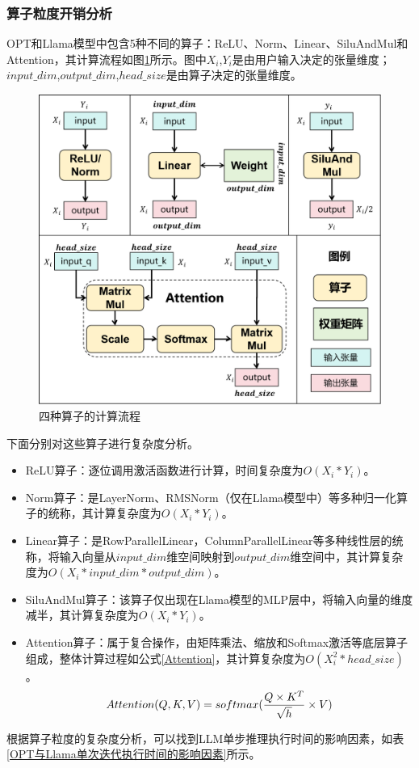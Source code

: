 \documentclass[a4paper, nosysfonts]{hpcchina}
\begin{document}
\subsubsection{算子粒度开销分析}
OPT和Llama模型中包含5种不同的算子：ReLU、Norm、Linear、SiluAndMul和Attention，其计算流程如图\ref{四种算子的计算流程}所示。图中$X_i$,$Y_i$是由用户输入决定的张量维度；$input\_dim$,$output\_dim$,$head\_size$是由算子决定的张量维度。 
\par
\begin{figure}[!htbp]
  \centering
  \includegraphics[width=0.9\linewidth]
  {四种算子的计算流程.png}
  \caption{四种算子的计算流程}
  \label{四种算子的计算流程}
\end{figure}

下面分别对这些算子进行复杂度分析。 \par
\begin{itemize}
  \item ReLU算子：逐位调用激活函数进行计算，时间复杂度为$O(X_i*Y_i)$。
  \item Norm算子：是LayerNorm、RMSNorm（仅在Llama模型中）等多种归一化算子的统称，其计算复杂度为$O(X_i*Y_i)$。
  \item Linear算子：是RowParallelLinear，ColumnParallelLinear等多种线性层的统称，将输入向量从$input\_dim$维空间映射到$output\_dim$维空间中，其计算复杂度为$O(X_i*input\_dim*output\_dim)$。
  \item SiluAndMul算子：该算子仅出现在Llama模型的MLP层中，将输入向量的维度减半，其计算复杂度为$O(X_i*Y_i)$。
  \item Attention算子：属于复合操作，由矩阵乘法、缩放和Softmax激活等底层算子组成，整体计算过程如公式\ref{Attention}，其计算复杂度为$O(X_i^2*head\_size)$。
  \begin{equation}
    \small
    Attention(Q,K,V)=softmax(\frac{Q\times K^T}{\sqrt{h}}\times V)
    \label{Attention}
  \end{equation}
\end{itemize}
根据算子粒度的复杂度分析，可以找到LLM单步推理执行时间的影响因素，如表\ref{OPT与Llama单次迭代执行时间的影响因素}所示。
\end{document}
